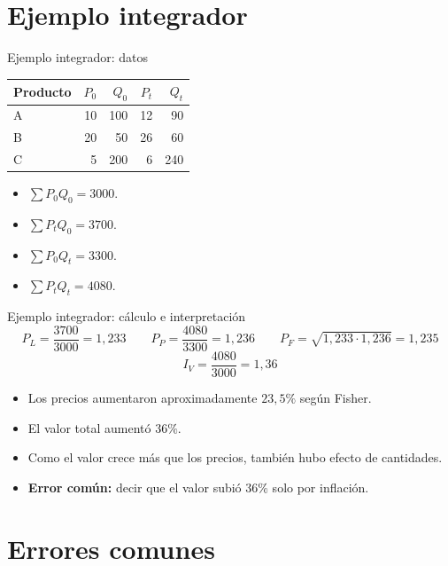 \documentclass[aspectratio=169,11pt]{beamer}
\newcommand{\errorcomun}[1]{\textbf{Error común:} #1}
\begin{document}
\section{Ejemplo integrador}

\begin{frame}{Ejemplo integrador: datos}
\small
\begin{center}
\begin{tabular}{lrrrr}
\toprule
Producto & $P_0$ & $Q_0$ & $P_t$ & $Q_t$ \\
\midrule
A & 10 & 100 & 12 & 90 \\
B & 20 & 50 & 26 & 60 \\
C & 5 & 200 & 6 & 240 \\
\bottomrule
\end{tabular}
\end{center}
\begin{itemize}
  \item $\sum P_0Q_0=3000$.
  \item $\sum P_tQ_0=3700$.
  \item $\sum P_0Q_t=3300$.
  \item $\sum P_tQ_t=4080$.
\end{itemize}
\end{frame}

\begin{frame}{Ejemplo integrador: cálculo e interpretación}
\small
\[
P_L=\frac{3700}{3000}=1{,}233 \qquad
P_P=\frac{4080}{3300}=1{,}236 \qquad
P_F=\sqrt{1{,}233\cdot1{,}236}=1{,}235
\]
\[
I_V=\frac{4080}{3000}=1{,}36
\]
\begin{itemize}
  \item Los precios aumentaron aproximadamente $23{,}5\%$ según Fisher.
  \item El valor total aumentó $36\%$.
  \item Como el valor crece más que los precios, también hubo efecto de cantidades.
  \item \errorcomun{decir que el valor subió $36\%$ solo por inflación.}
\end{itemize}
\end{frame}

\section{Errores comunes}
\end{document}
